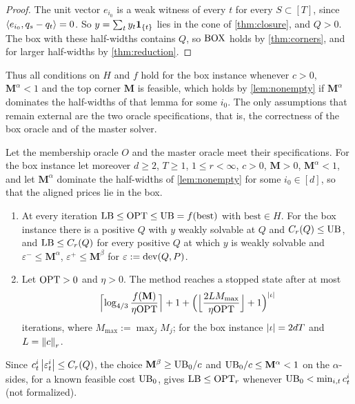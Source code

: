 \begin{proof}
The unit vector $e_{i_0}$ is a weak witness of every $t$ for every $S\subset[T]$, since $\langle e_{i_0}, q_s-q_t\rangle=0$. So $y=\sum_ty_t\mathbf 1_{\left\{ t \right\}}$ lies in the cone of \cref{thm:closure}, and $Q>0$. The box with these half-widths contains $Q$, so $\mathrm{BOX}$ holds by \cref{thm:corners}, and for larger half-widths by \cref{thm:reduction}.
\end{proof}

Thus all conditions on $H$ and $f$ hold for the box instance whenever $c>0$, $\mathbf M^\alpha<1$ and the top corner $\mathbf M$ is feasible, which holds by \cref{lem:nonempty} if $\mathbf M^\alpha$ dominates the half-widths of that lemma for some $i_0$. The only assumptions that remain external are the two oracle specifications, that is, the correctness of the box oracle and of the master solver.

\begin{theorem}\label{thm:algo}
Let the membership oracle $O$ and the master oracle meet their specifications. For the box instance let moreover $d\ge2$, $T\ge1$, $1\le r<\infty$, $c>0$, $\mathbf M>0$, $\mathbf M^\alpha<1$, and let $\mathbf M^\alpha$ dominate the half-widths of \cref{lem:nonempty} for some $i_0\in[d]$, so that the aligned prices lie in the box.
\begin{enumerate}[label=(\alph*)]
\item At every iteration $\mathrm{LB}\le\mathrm{OPT}\le\mathrm{UB}=f(\mathrm{best})$ with $\mathrm{best}\in H$. For the box instance there is a positive $Q$ with $y$ weakly solvable at $Q$ and $C_r(Q)\le\mathrm{UB}$, and $\mathrm{LB}\le C_r(Q)$ for every positive $Q$ at which $y$ is weakly solvable and $\varepsilon^-\le\mathbf M^\alpha$, $\varepsilon^+\le\mathbf M^\beta$ for $\varepsilon:=\operatorname{dev}(Q,P)$.
\item Let $\mathrm{OPT}>0$ and $\eta>0$. The method reaches a stopped state after at most
\[
\Bigl\lceil\log_{4/3}\frac{f(\mathbf M)}{\eta\mathrm{OPT}}\Bigr\rceil+1+\Bigl(\Bigl\lfloor\frac{2LM_{\max}}{\eta\mathrm{OPT}}\Bigr\rfloor+1\Bigr)^{\left\lvert \iota \right\rvert}
\]
iterations, where $M_{\max}:=\max_jM_j$; for the box instance $\left\lvert \iota \right\rvert=2dT$ and $L=\left\lVert c \right\rVert_r$.
\end{enumerate}
\end{theorem}
Since $c^i_t\left\lvert \varepsilon^i_t \right\rvert\le C_r(Q)$, the choice $\mathbf M^\beta\ge\mathrm{UB}_0/c$ and $\mathrm{UB}_0/c\le\mathbf M^\alpha<1$ on the $\alpha$-sides, for a known feasible cost $\mathrm{UB}_0$, gives $\mathrm{LB}\le\mathrm{OPT}_r$ whenever $\mathrm{UB}_0<\min_{i,t}c^i_t$ (not formalized).

